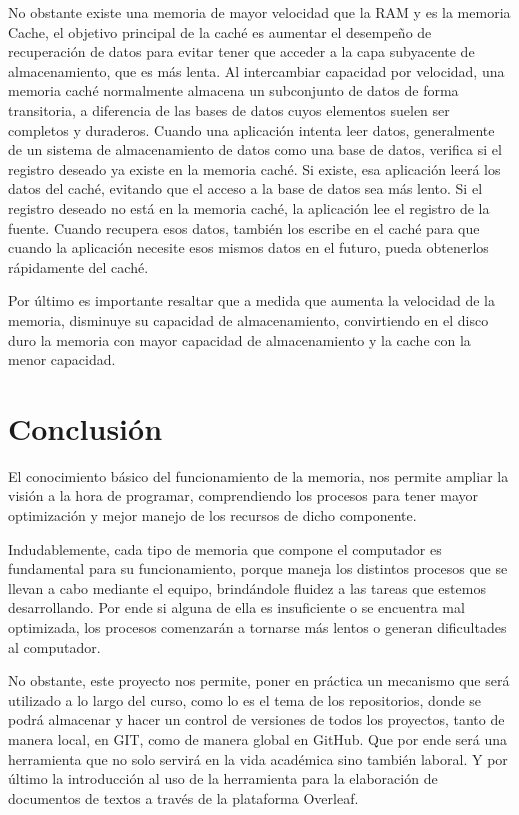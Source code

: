 \documentclass{article}
\begin{document}
\vspace{0.5cm}

No obstante existe una memoria  de mayor velocidad que la RAM y es la memoria Cache, el objetivo principal de la caché es aumentar el desempeño de recuperación de datos para evitar tener que acceder a la capa subyacente de almacenamiento, que es más lenta. Al intercambiar capacidad por velocidad, una memoria caché normalmente almacena un subconjunto de datos de forma transitoria, a diferencia de las bases de datos cuyos elementos suelen ser completos y duraderos. Cuando una aplicación intenta leer datos, generalmente de un sistema de almacenamiento de datos como una base de datos, verifica si el registro deseado ya existe en la memoria caché. Si existe, esa aplicación leerá los datos del caché, evitando que el acceso a la base de datos sea más lento. Si el registro deseado no está en la memoria caché, la aplicación lee el registro de la fuente. Cuando recupera esos datos, también los escribe en el caché para que cuando la aplicación necesite esos mismos datos en el futuro, pueda obtenerlos rápidamente del caché.\cite{awsite}

\vspace{0.5cm}

Por último es importante resaltar que a medida que aumenta la velocidad de la memoria, disminuye su capacidad de almacenamiento, convirtiendo en el disco duro la memoria  con mayor capacidad de almacenamiento y la cache con la menor capacidad.

\section{Conclusión}
El conocimiento básico del funcionamiento de la memoria, nos permite ampliar la visión a la hora de programar, comprendiendo los procesos para tener mayor optimización y mejor manejo de los recursos de dicho componente.

\vspace{0.5cm}

 Indudablemente, cada tipo de memoria que compone el computador  es fundamental para su funcionamiento, porque maneja los distintos procesos que se llevan a cabo mediante el equipo, brindándole fluidez a las tareas que estemos desarrollando. Por ende si alguna de ella es insuficiente o se encuentra mal optimizada, los procesos comenzarán a tornarse más lentos o generan dificultades al computador.
 
 \vspace{0.5cm}

No obstante, este proyecto nos permite, poner en práctica un mecanismo que será utilizado a lo largo del curso, como lo es el tema de los repositorios, donde se podrá almacenar y hacer un control de versiones de todos los proyectos, tanto de manera local, en GIT, como de manera global en GitHub. Que por ende será una herramienta que no solo servirá en la vida académica sino también laboral. Y por último la introducción al uso de la herramienta para la elaboración de documentos de textos a través de la plataforma Overleaf.

\vspace{0.5cm}




\end{document}
